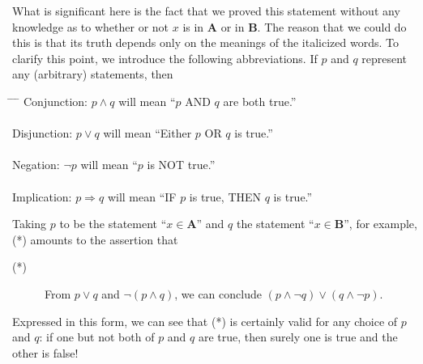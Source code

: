 \documentclass{article}
\newcommand\A{\mathbf A}
\newcommand\B{\mathbf B}
\newcommand{\0}{\mathbf 0}
\newcommand{\1}{\mathbf 1}
\begin{document}
What is significant here is the fact that we proved this statement without any knowledge as to whether or not $x$ is in $\A$ or in $\B$. The reason that we could do this is that its truth depends only on the meanings of the italicized words. To clarify this point, we introduce the following abbreviations. If $p$ and $q$ represent any (arbitrary) statements, then

\begin{tabbing}
\hspace*{1cm} \= \hspace{2.5cm} \= \hspace{1.2cm} \= \kill
\> Conjunction: \> $p \land q$       \> will mean ``$p$ AND $q$ are both true.'' \\
\ \\
\> Disjunction: \> $p \lor q$        \> will mean ``Either $p$ OR $q$ is true.'' \\
\ \\
\> Negation:    \> $\lnot p$         \> will mean ``$p$ is NOT true.'' \\
\ \\
\> Implication: \> $p \Rightarrow q$ \> will mean ``IF $p$ is true, THEN $q$ is true.''
\end{tabbing}

Taking $p$ to be the statement ``$x \in \A$'' and $q$ the statement ``$x \in \B$'', for example, (*) amounts to the assertion that
\begin{description}
  \item[(*)] From $p \lor q$ and $\lnot (p \land q)$, we can conclude $(p \land \lnot q) \lor (q \land \lnot p)$.
\end{description}

Expressed in this form, we can see that (*) is certainly valid for any choice of $p$ and $q$: if one but not both of $p$ and $q$ are true, then surely one is true and the other is false!
\end{document}
